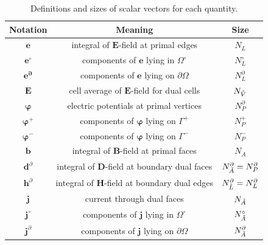 \documentclass{article}
\begin{document}
\begin{table}[]
    \centering
\begin{tabular}{c c c}
     \hline
     \textbf{Notation}  & \textbf{Meaning}  & \textbf{Size} \\
     \hline
     $\mathbf{e}$ & integral of $\mathbf{E}$-field at primal edges& $N_L$ \\
     $\mathbf{e^\circ}$ & components of $\mathbf{e}$ lying in $\Omega^\circ$ & $N_L^\circ$ \\
     $\mathbf{e^\partial}$ & components of $\mathbf{e}$ lying on $\partial \Omega$ & $N_L^\partial$ \\
     $\mathbf{E}$ & cell average of $\mathbf{E}$-field for dual cells & $N_{\Tilde{V}}$ \\ 
     $\bm{\varphi}$ & electric potentials at primal vertices & $N_P^\partial$ \\
     $\bm{\varphi}^+$ & components of $\bm{\varphi}$ lying on $\Gamma^+$ & $N_P^+$ \\
     $\bm{\varphi}^-$ & components of $\bm{\varphi}$ lying on $\Gamma^-$ & $N_P^-$ \\
     $\mathbf{b}$ & integral of $\mathbf{B}$-field at primal faces & $N_A$ \\
     $\mathbf{d}^\partial$ & integral of $\mathbf{D}$-field at boundary dual faces & $N_{\Tilde{A}}^\partial = N_P^\partial$ \\
     $\mathbf{h}^\partial$ & integral of $\mathbf{H}$-field at boundary dual edges & $N_{\Tilde{L}}^\partial = N_L^\partial$ \\
     $\mathbf{j}$ & current through dual faces & $N_{\Tilde{A}}$ \\
     $\mathbf{j}^\circ$ & components of $\mathbf{j}$ lying in $\Omega^\circ$ & $N_{\Tilde{A}}^\circ$ \\
     $\mathbf{j}^\partial$ & components of $\mathbf{j}$ lying on $\partial \Omega$ & $N_{\Tilde{A}}^\partial$ \\
     \hline
\end{tabular}
    \caption{Definitions and sizes of scalar vectors for each quantity.}
    \label{tab:def_size_var}
\end{table}
\end{document}

